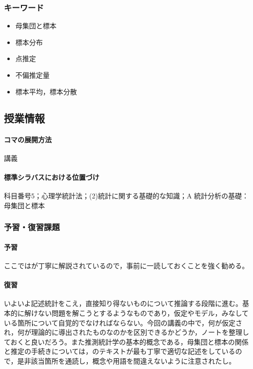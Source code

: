 \subsubsection{キーワード}
\begin{itemize}
\item 母集団と標本
\item 標本分布
\item 点推定
\item 不偏推定量
\item 標本平均，標本分散
\end{itemize}
\subsection{授業情報}
\paragraph{コマの展開方法}
講義
\paragraph{標準シラバスにおける位置づけ}
科目番号5；心理学統計法；(2)統計に関する基礎的な知識；A 統計分析の基礎：母集団と標本
\subsubsection{予習・復習課題}
\paragraph{予習}
ここでは\citet{Yamada2004}が丁寧に解説されているので，事前に一読しておくことを強く勧める。
\paragraph{復習}
いよいよ記述統計をこえ，直接知り得ないものについて推論する段階に進む。基本的に解けない問題を解こうとするようなものであり，仮定やモデル，みなしている箇所について自覚的でなければならない。今回の講義の中で，何が仮定され，何が理論的に導出されたものなのかを区別できるかどうか，ノートを整理しておくと良いだろう。また推測統計学の基本的概念である，母集団と標本の関係と推定の手続きについては，\citet{Yamada2004}のテキストが最も丁寧で適切な記述をしているので，是非該当箇所を通読し，概念や用語を間違えないように注意されたし。
